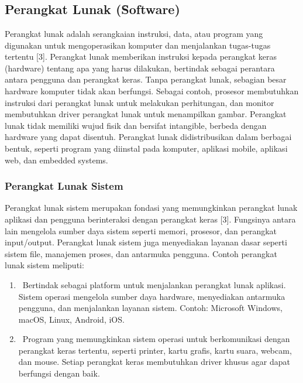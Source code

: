 \chapter{\babDua}

\section{Perangkat Lunak (\f{Software})}
Perangkat lunak adalah serangkaian instruksi, data, atau program yang digunakan untuk mengoperasikan komputer dan menjalankan tugas-tugas tertentu [3]. Perangkat lunak memberikan instruksi kepada perangkat keras (hardware) tentang apa yang harus dilakukan, bertindak sebagai perantara antara pengguna dan perangkat keras. Tanpa perangkat lunak, sebagian besar hardware komputer tidak akan berfungsi. Sebagai contoh, prosesor membutuhkan instruksi dari perangkat lunak untuk melakukan perhitungan, dan monitor membutuhkan driver perangkat lunak untuk menampilkan gambar. Perangkat lunak tidak memiliki wujud fisik dan bersifat intangible, berbeda dengan hardware yang dapat disentuh. Perangkat lunak didistribusikan dalam berbagai bentuk, seperti program yang diinstal pada komputer, aplikasi mobile, aplikasi web, dan embedded systems.

\subsection{Perangkat Lunak Sistem}
Perangkat lunak sistem merupakan fondasi yang memungkinkan perangkat lunak aplikasi dan pengguna berinteraksi dengan perangkat keras [3]. Fungsinya antara lain mengelola sumber daya sistem seperti memori, prosesor, dan perangkat input/output. Perangkat lunak sistem juga menyediakan layanan dasar seperti sistem file, manajemen proses, dan antarmuka pengguna. Contoh perangkat lunak sistem meliputi:

\begin{enumerate}
	\item {} Bertindak sebagai platform untuk menjalankan perangkat lunak aplikasi. Sistem operasi mengelola sumber daya hardware, menyediakan antarmuka pengguna, dan menjalankan layanan sistem. Contoh: Microsoft Windows, macOS, Linux, Android, iOS.

	\item {} Program yang memungkinkan sistem operasi untuk berkomunikasi dengan perangkat keras tertentu, seperti printer, kartu grafis, kartu suara, webcam, dan mouse. Setiap perangkat keras membutuhkan driver khusus agar dapat berfungsi dengan baik.

\end{enumerate}


